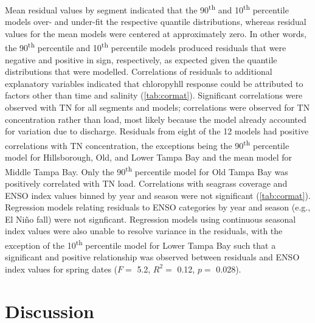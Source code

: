 \documentclass{svjour3}\usepackage[]{graphicx}\usepackage[]{color}
\newcommand{\nine}{90\textsuperscript{th} percentile }
\newcommand{\ten}{10\textsuperscript{th} percentile }
\begin{document}
Mean residual values by segment indicated that the 90\textsuperscript{th} and \ten models over- and under-fit the respective quantile distributions, whereas residual values for the mean models were centered at approximately zero.  In other words, the \nine and \ten models produced residuals that were negative and positive in sign, respectively, as expected given the quantile distributions that were modelled.  Correlations of residuals to additional explanatory variables indicated that chloropyhll response could be attributed to factors other than time and salinity (\cref{tab:cormat}). Significant correlations were observed with \ac{TN} for all segments and models; correlations were observed for \ac{TN} concentration rather than load, most likely because the model already accounted for variation due to discharge.  Residuals from eight of the 12 models had positive correlations with \ac{TN} concentration, the exceptions being the \nine model for Hillsborough, Old, and Lower Tampa Bay and the mean model for Middle Tampa Bay.  Only the \nine model for Old Tampa Bay was positively correlated with \ac{TN} load.  Correlations with seagrass coverage and \ac{ENSO} index values binned by year and season were not significant (\cref{tab:cormat}).  Regression models relating residuals to \ac{ENSO} categories by year and season (e.g., El Ni\~{n}o fall) were not signficant.  Regression models using continuous seasonal index values were also unable to resolve variance in the residuals, with the exception of the \ten model for Lower Tampa Bay such that a significant and positive relationship was observed between residuals and \ac{ENSO} index values for spring dates ($F=$ 5.2, $R^2 =$ 0.12, $p=$ 0.028).  

\section{Discussion}
\end{document}
